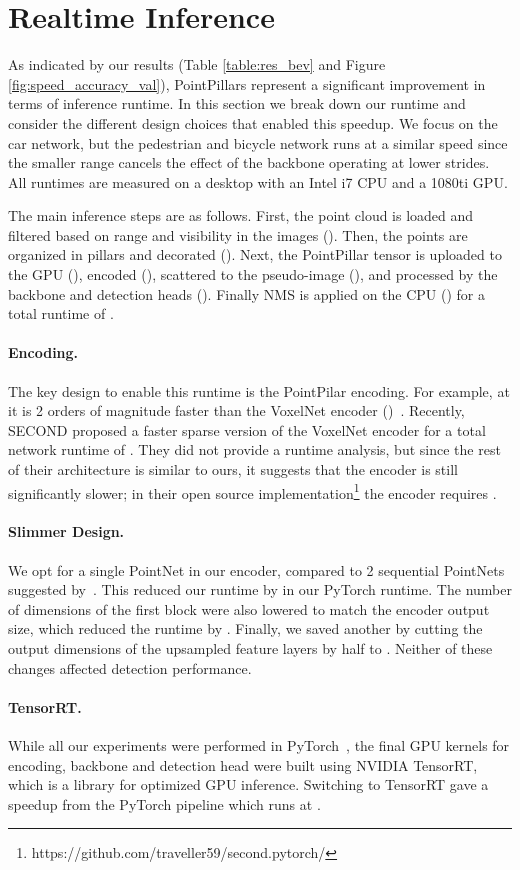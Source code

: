 \documentclass[10pt,twocolumn,letterpaper]{article}
\newcommand{\mypar}[1]{\vspace{-4mm}\paragraph{#1}}
\newcommand{\figref}[1]{Figure \ref{#1}}
\newcommand{\tableref}[1]{Table \ref{#1}}
\newcommand{\squeeze}{\vspace{-0.5mm}}
\begin{document}
 


\section{Realtime Inference} \label{sec:runtime}
\squeeze
As indicated by our results (\tableref{table:res_bev} and \figref{fig:speed_accuracy_val}), PointPillars represent a significant improvement in terms of inference runtime.
In this section we break down our runtime and consider the different design choices that enabled this speedup.
We focus on the car network, but the pedestrian and bicycle network runs at a similar speed since the smaller range cancels the effect of the backbone operating at lower strides.
All runtimes are measured on a desktop with an Intel i7 CPU and a 1080ti GPU.

The main inference steps are as follows.
First, the point cloud is loaded and filtered based on range and visibility in the images ().
Then, the points are organized in pillars and decorated ().
Next, the PointPillar tensor is uploaded to the GPU (), encoded (), scattered to the pseudo-image (), and processed by the backbone and detection heads ().
Finally NMS is applied on the CPU () for a total runtime of .

\mypar{Encoding.}
The key design to enable this runtime is the PointPilar encoding.
For example, at  it is 2 orders of magnitude faster than the VoxelNet encoder ()~\cite{voxelnet}.
Recently, SECOND proposed a faster sparse version of the VoxelNet encoder for a total network runtime of .
They did not provide a runtime analysis, but since the rest of their architecture is similar to ours, it suggests that the encoder is still significantly slower; in their open source implementation\footnote{https://github.com/traveller59/second.pytorch/} the encoder requires .

\mypar{Slimmer Design.}
We opt for a single PointNet in our encoder, compared to 2 sequential PointNets suggested by~\cite{voxelnet}.
This reduced our runtime by  in our PyTorch runtime.
The number of dimensions of the first block were also lowered  to match the encoder output size, which reduced the runtime by .
Finally, we saved another  by cutting the output dimensions of the upsampled feature layers by half to .
Neither of these changes affected detection performance.

\mypar{TensorRT.}
While all our experiments were performed in PyTorch~\cite{pytorch}, the final GPU kernels for encoding, backbone and detection head were built using NVIDIA TensorRT, which is a library for optimized GPU inference. 
Switching to TensorRT gave a  speedup from the PyTorch pipeline which runs at .
\end{document}

